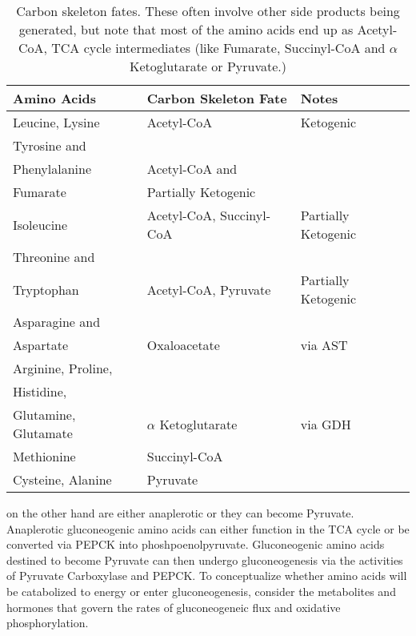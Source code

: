 \documentclass{tufte-handout}
\begin{document}
\begin{table}[]
\centering
\caption{Carbon skeleton fates.  These often involve other side products being generated, but note that most of the amino acids end up as Acetyl-CoA, TCA cycle intermediates (like Fumarate, Succinyl-CoA and $\alpha$ Ketoglutarate or Pyruvate.)}
\label{tab:carbon-skeletons}
\begin{tabular}{lll}
\textbf{Amino Acids}                                        & \textbf{Carbon Skeleton Fate}        & \textbf{Notes}                 \\ \hline
Leucine, Lysine                                    & Acetyl-CoA                  & Ketogenic  \\ \hline
Tyrosine and\\ Phenylalanine                         & Acetyl-CoA and\\ Fumarate     & Partially Ketogenic   \\ \hline
Isoleucine                                         & Acetyl-CoA, Succinyl-CoA & Partially Ketogenic   \\ \hline
Threonine and\\ Tryptophan                           & Acetyl-CoA, Pyruvate     & Partially Ketogenic   \\ \hline
Asparagine and\\ Aspartate                           & Oxaloacetate                & via AST               \\ \hline
Arginine, Proline,\\ Histidine,\\ Glutamine, Glutamate & $\alpha$ Ketoglutarate      & via GDH               \\ \hline
Methionine                                         & Succinyl-CoA                &                       \\ \hline
Cysteine, Alanine                                  & Pyruvate                    &                      
\end{tabular}
\end{table}

 on the other hand are either anaplerotic or they can become Pyruvate. Anaplerotic gluconeogenic amino acids can either function in the TCA cycle or be converted via PEPCK into phoshpoenolpyruvate.  Gluconeogenic amino acids destined  to become Pyruvate  can then undergo gluconeogenesis via the activities of Pyruvate Carboxylase and PEPCK. To conceptualize whether amino acids will be catabolized to energy or enter gluconeogenesis, consider the metabolites and hormones that govern the rates of gluconeogeneic flux and oxidative phosphorylation.



\end{document}
